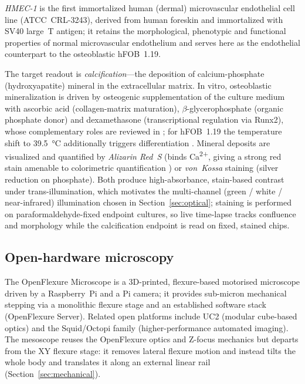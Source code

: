 \emph{HMEC-1} is the first immortalized human (dermal) microvascular endothelial
cell line \cite{Ades1992HMEC} (ATCC~CRL-3243), derived from human foreskin and
immortalized with SV40 large~T antigen; it retains the morphological,
phenotypic and functional properties of normal microvascular endothelium and
serves here as the endothelial counterpart to the osteoblastic hFOB~1.19.

The target readout is \emph{calcification}---the deposition of calcium-phosphate
(hydroxyapatite) mineral in the extracellular matrix. In vitro, osteoblastic
mineralization is driven by osteogenic supplementation of the culture medium
with ascorbic acid (collagen-matrix maturation), $\beta$-glycerophosphate
(organic phosphate donor) and dexamethasone (transcriptional regulation via
Runx2), whose complementary roles are reviewed in
\cite{Langenbach2013Osteogenic}; for hFOB~1.19 the temperature shift to
\SI{39.5}{\celsius} additionally triggers differentiation
\cite{Harris1995hFOB}. Mineral deposits are visualized and quantified by
\emph{Alizarin Red~S} (binds Ca\textsuperscript{2+}, giving a strong red stain
amenable to colorimetric quantification \cite{Gregory2004AlizarinRed}) or
\emph{von~Kossa} staining (silver reduction on phosphate). Both produce
high-absorbance, stain-based contrast under trans-illumination, which motivates
the multi-channel (green / white / near-infrared) illumination chosen in
Section~\ref{sec:optical}; staining is performed on
paraformaldehyde-fixed endpoint cultures, so live time-lapse tracks confluence
and morphology while the calcification endpoint is read on fixed, stained chips.

\subsection{Open-hardware microscopy}
The OpenFlexure Microscope \cite{Collins2020,Sharkey2016} is a 3D-printed,
flexure-based motorised microscope driven by a Raspberry~Pi and a Pi camera; it
provides sub-micron mechanical stepping via a monolithic flexure stage and an
established software stack (OpenFlexure Server). Related open platforms include
UC2 \cite{Diederich2020} (modular cube-based optics) and the Squid/Octopi
family \cite{Li2020Squid} (higher-performance automated imaging). The mesoscope
reuses the OpenFlexure optics and Z-focus mechanics but departs from the XY
flexure stage: it removes lateral flexure motion and instead tilts the whole
body and translates it along an external linear rail
(Section~\ref{sec:mechanical}).


